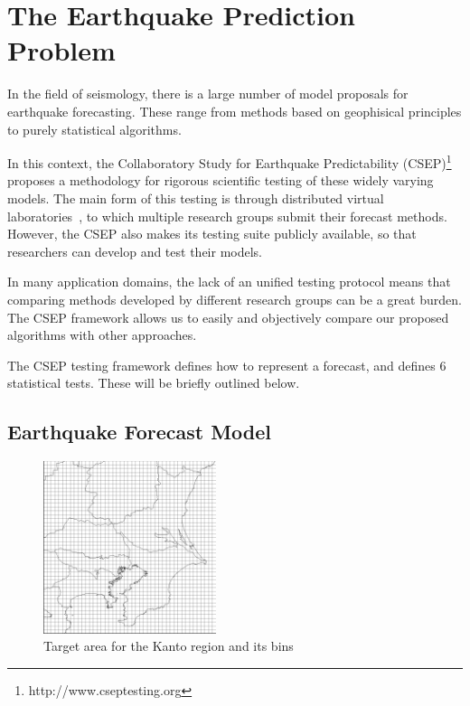 \documentclass{sig-alternate}
\begin{document}
\section{The Earthquake Prediction Problem}

In the field of seismology, there is a large number of model proposals
for earthquake forecasting. These range from methods based on
geophisical principles to purely statistical algorithms.

In this context, the Collaboratory Study for Earthquake Predictability
(CSEP)\footnote{http://www.cseptesting.org} proposes a methodology for
rigorous scientific testing of these widely varying models. The main
form of this testing is through distributed virtual
laboratories~\cite{Nanjo2011b}, to which multiple research groups
submit their forecast methods. However, the CSEP also makes its
testing suite publicly available, so that researchers can develop and
test their models.

In many application domains, the lack of an unified testing protocol
means that comparing methods developed by different research groups
can be a great burden. The CSEP framework allows us to easily and
objectively compare our proposed algorithms with other approaches.

The CSEP testing framework defines how to represent a forecast, and
defines 6 statistical tests. These will be briefly outlined below.

\subsection{Earthquake Forecast Model}\label{CSEP_definition} 

\begin{figure}
  \begin{center}
    \includegraphics[width=0.45\textwidth]{img/kantomap.png}
  \end{center}
  \caption{Target area for the Kanto region and its bins}
  \label{fig:kantomap}
\end{figure}
\end{document}
